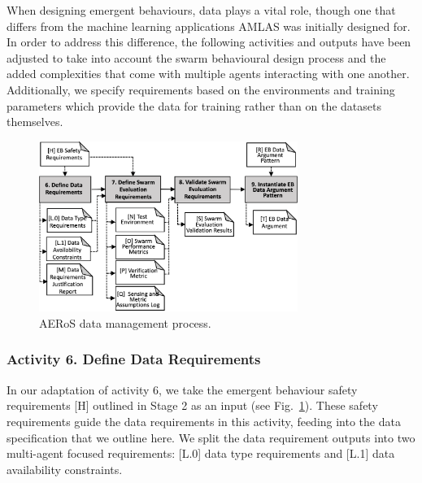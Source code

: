\documentclass[runningheads]{llncs}
\begin{document}
When designing emergent behaviours, data plays a vital role, though one that differs from the machine learning applications AMLAS was initially designed for. In order to address this difference, the following activities and outputs have been adjusted to take into account the swarm behavioural design process and the added complexities that come with multiple agents interacting with one another. Additionally, we specify requirements based on the environments and training parameters which provide the data for training rather than on the datasets themselves.

\vspace{-4ex}
\begin{figure}
	\centering
	\includegraphics[width=0.75\textwidth]{figures/AMLAS-STAGE-3-V4.png}
	\vspace{-2ex}
	\caption{AERoS data management process.}
	\label{amlas-a-stage3}
	\vspace{-4ex}
\end{figure}

\vspace{-4ex}
\subsubsection*{Activity 6. Define Data Requirements}


In our adaptation of activity 6, we take the emergent behaviour safety requirements [H] outlined in Stage 2 as an input (see Fig.~\ref{amlas-a-stage3}). These safety requirements guide the data requirements in this activity, feeding into the data specification that we outline here. We split the data requirement outputs into two multi-agent focused requirements: [L.0] data type requirements and [L.1] data availability constraints.
\end{document}
